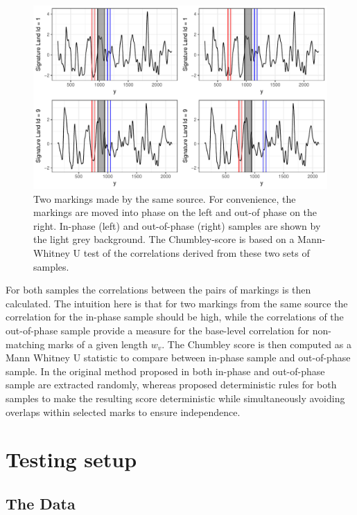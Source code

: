 \documentclass[12pt]{article}
\begin{document}
\begin{figure}

{\centering \includegraphics[width=\textwidth]{figures/win-comparison-1} 

}

\caption{Two markings made by the same source. For convenience, the markings are moved into phase on the left and out-of phase on the right. In-phase (left) and out-of-phase (right) samples are shown by the light grey background. The Chumbley-score is based on a Mann-Whitney U test of the correlations derived from these two sets of samples.}\label{fig:win-comparison}
\end{figure}

For both samples the correlations between the pairs of markings is then
calculated. The intuition here is that for two markings from the same
source the correlation for the in-phase sample should be high, while the
correlations of the out-of-phase sample provide a measure for the
base-level correlation for non-matching marks of a given length \(w_v\).
The Chumbley score is then computed as a Mann Whitney U statistic to
compare between in-phase sample and out-of-phase sample. In the original
method proposed in \citet{chumbley} both in-phase and out-of-phase
sample are extracted randomly, whereas \citet{hadler} proposed
deterministic rules for both samples to make the resulting score
deterministic while simultaneously avoiding overlaps within selected
marks to ensure independence.

\section{Testing setup}\label{testing-setup}

\subsection{The Data}\label{the-data}
\end{document}

